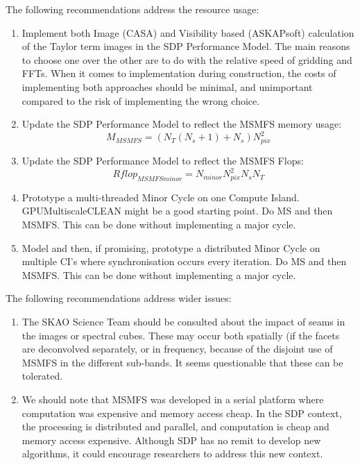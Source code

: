 \documentclass[11pt,a4paper,variablewidth]{article}
\begin{document}
The following recommendations address the resource usage:
\begin{enumerate}[resume]
\item Implement both Image (CASA) and Visibility based (ASKAPsoft) calculation of the Taylor term images in the SDP Performance Model. The main reasons to choose one over the other are to do with the relative speed of gridding and FFTs. When it comes to implementation during construction, the costs of implementing both approaches should be minimal, and unimportant compared to the risk of implementing the wrong choice.
\item Update the SDP Performance Model to reflect the MSMFS memory usage:
\begin{equation}
M_{MSMFS} = (N_T (N_s + 1) + N_s) N_{pix}^2 
\end{equation}
\item Update the SDP Performance Model to reflect the MSMFS Flops:
\begin{equation}
Rflop_{MSMFSminor} = N_{minor} N_{pix}^2 N_s N_T	
\end{equation}
\item Prototype a multi-threaded Minor Cycle on one Compute Island. GPUMultiscaleCLEAN might be a good starting point. Do MS and then MSMFS. This can be done without implementing a major cycle.
\item Model and then, if promising, prototype a distributed Minor Cycle on multiple CI's where synchronisation occurs every iteration. Do MS and then MSMFS. This can be done without implementing a major cycle.\end{enumerate}

The following recommendations address wider issues:
\begin{enumerate}[resume]
\item The SKAO Science Team should be consulted about the impact of seams in the images or spectral cubes. These may occur both spatially (if the facets are deconvolved separately, or in frequency, because of the disjoint use of MSMFS in the different sub-bands. It seems questionable that these can be tolerated.

\item We should note that MSMFS was developed in a serial platform where computation was expensive and memory access cheap. In the SDP context, the processing is distributed and parallel, and computation is cheap and memory access expensive. Although SDP has no remit to develop new algorithms, it could encourage researchers to address this new context.
\end{enumerate}





\clearpage {}
%
\end{document}

